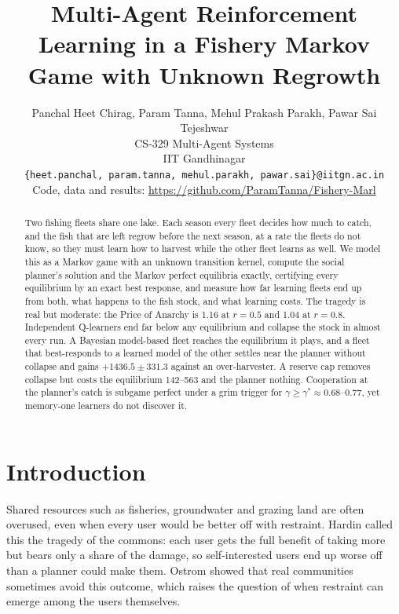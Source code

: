 \documentclass{article}
\title{Multi-Agent Reinforcement Learning in a Fishery Markov Game with Unknown Regrowth}
\author{
  Panchal Heet Chirag, Param Tanna, Mehul Prakash Parakh, Pawar Sai Tejeshwar \\
  CS-329 Multi-Agent Systems \\
  IIT Gandhinagar \\
  \texttt{\{heet.panchal, param.tanna, mehul.parakh, pawar.sai\}@iitgn.ac.in} \\
  Code, data and results: \url{https://github.com/ParamTanna/Fishery-Marl} \\
}
\begin{document}
\maketitle

\begin{abstract}
Two fishing fleets share one lake. Each season every fleet decides how much to catch, and the fish that are left regrow before the next season, at a rate the fleets do not know, so they must learn how to harvest while the other fleet learns as well. We model this as a Markov game with an unknown transition kernel, compute the social planner's solution and the Markov perfect equilibria exactly, certifying every equilibrium by an exact best response, and measure how far learning fleets end up from both, what happens to the fish stock, and what learning costs. The tragedy is real but moderate: the Price of Anarchy is 1.16 at $r=0.5$ and 1.04 at $r=0.8$. Independent Q-learners end far below any equilibrium and collapse the stock in almost every run. A Bayesian model-based fleet reaches the equilibrium it plays, and a fleet that best-responds to a learned model of the other settles near the planner without collapse and gains $+1436.5\pm331.3$ against an over-harvester. A reserve cap removes collapse but costs the equilibrium 142--563 and the planner nothing. Cooperation at the planner's catch is subgame perfect under a grim trigger for $\gamma\ge\gamma^*\approx0.68$--$0.77$, yet memory-one learners do not discover it.
\end{abstract}


\section{Introduction}
Shared resources such as fisheries, groundwater and grazing land are often overused, even when every user would be better off with restraint. Hardin \cite{hardin1968} called this the tragedy of the commons: each user gets the full benefit of taking more but bears only a share of the damage, so self-interested users end up worse off than a planner could make them. Ostrom \cite{ostrom1990} showed that real communities sometimes avoid this outcome, which raises the question of when restraint can emerge among the users themselves.
\end{document}

